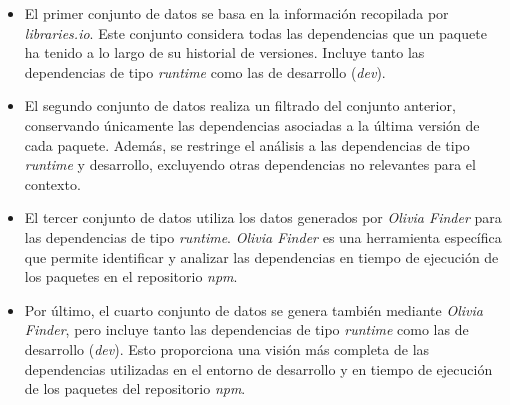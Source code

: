 \begin{itemize}
    \item El primer conjunto de datos se basa en la información recopilada por
          \textit{libraries.io}. Este conjunto considera todas las dependencias que un paquete ha
          tenido a lo largo de su historial de versiones. Incluye tanto las dependencias de tipo
          \textit{runtime} como las de desarrollo (\textit{dev}).
    \item El segundo conjunto de datos realiza un filtrado del conjunto anterior, conservando
          únicamente las dependencias asociadas a la última versión de cada paquete. Además, se
          restringe el análisis a las dependencias de tipo \textit{runtime} y desarrollo, excluyendo
          otras dependencias no relevantes para el contexto.

    \item El tercer conjunto de datos utiliza los datos generados por \textit{Olivia Finder}
          para las dependencias de tipo \textit{runtime}. \textit{Olivia Finder} es una herramienta
          específica que permite identificar y analizar las dependencias en tiempo de ejecución de
          los paquetes en el repositorio \textit{npm}.

    \item Por último, el cuarto conjunto de datos se genera también mediante \textit{Olivia Finder},
          pero incluye tanto las dependencias de tipo \textit{runtime} como las de desarrollo
          (\textit{dev}). Esto proporciona una visión más completa de las dependencias utilizadas en
          el entorno de desarrollo y en tiempo de ejecución de los paquetes del repositorio \textit{npm}.
\end{itemize}


